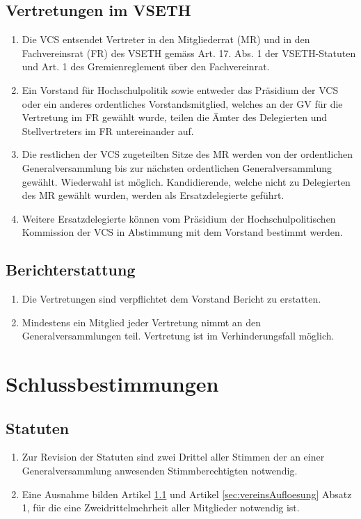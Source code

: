 \subsection{Vertretungen im VSETH}
\begin{enumerate}
\item Die VCS entsendet Vertreter in den Mitgliederrat (MR) und in den Fachvereinsrat (FR) des VSETH gemäss Art. 17. Abs. 1 der VSETH-Statuten und Art. 1 des Gremienreglement über den Fachvereinrat.
\item Ein Vorstand für Hochschulpolitik sowie entweder das Präsidium der VCS oder ein anderes ordentliches Vorstandsmitglied, welches an der GV für die Vertretung im FR gewählt wurde, teilen die Ämter des Delegierten und Stellvertreters im FR untereinander auf.
\item Die restlichen der VCS zugeteilten Sitze des MR werden von der ordentlichen Generalversammlung bis zur nächsten ordentlichen Generalversammlung gewählt. Wiederwahl ist möglich. Kandidierende, welche nicht zu Delegierten des MR gewählt wurden, werden als Ersatzdelegierte geführt.
\item Weitere Ersatzdelegierte können vom Präsidium der Hochschulpolitischen Kommission der VCS in Abstimmung mit dem Vorstand bestimmt werden.
\end{enumerate}

\subsection{Berichterstattung}
\begin{enumerate}
\item Die Vertretungen sind verpflichtet dem Vorstand Bericht zu
erstatten.
\item Mindestens ein Mitglied jeder Vertretung nimmt an den Generalversammlungen teil. Vertretung ist im Verhinderungsfall möglich.
\end{enumerate}

\section{Schlussbestimmungen}

\subsection{Statuten} \label{sec:statutenAenderung}

\begin{enumerate}
\item Zur Revision der Statuten sind zwei Drittel aller Stimmen der an einer Generalversammlung anwesenden Stimmberechtigten notwendig.
\item Eine Ausnahme bilden Artikel \ref{sec:statutenAenderung} und Artikel \ref{sec:vereinsAufloesung} Absatz 1, für die eine Zweidrittelmehrheit aller Mitglieder notwendig ist.
\end{enumerate}

